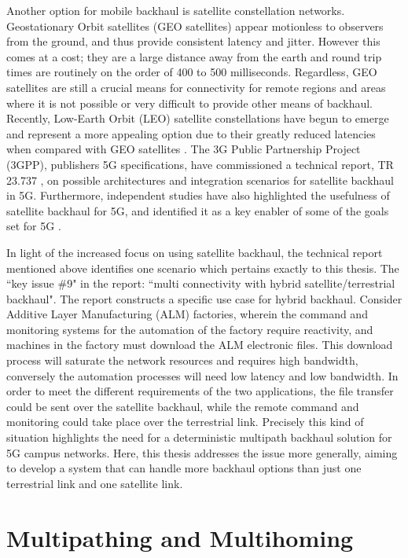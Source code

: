 Another option for mobile backhaul is satellite constellation networks. Geostationary Orbit satellites (GEO satellites) appear motionless to observers from the ground, and thus provide consistent latency and jitter. However this comes at a cost; they are a large distance away from the earth and round trip times are routinely on the order of 400 to 500 milliseconds. Regardless, GEO satellites are still a crucial means for connectivity for remote regions and areas where it is not possible or very difficult to provide other means of backhaul. Recently, Low-Earth Orbit (LEO) satellite constellations have begun to emerge and represent a more appealing option due to their greatly reduced latencies when compared with GEO satellites \cite{deutschmann2022broadband}. The 3G Public Partnership Project (3GPP), publishers 5G specifications, have commissioned a technical report, TR 23.737 \cite{3gpp.23.737}, on possible architectures and integration scenarios for satellite backhaul in 5G. Furthermore, independent studies have also highlighted the usefulness of satellite backhaul for 5G, and identified it as a key enabler of some of the goals set for 5G \cite{artiga2016terrestrial}.

In light of the increased focus on using satellite backhaul, the technical report mentioned above identifies one scenario which pertains exactly to this thesis. The “key issue \#9" in the report: “multi connectivity with hybrid satellite/terrestrial backhaul". The report constructs a specific use case for hybrid backhaul. Consider Additive Layer Manufacturing (ALM) factories, wherein the command and monitoring systems for the automation of the factory require reactivity, and machines in the factory must download the ALM electronic files. This download process will saturate the network resources and requires high bandwidth, conversely the automation processes will need low latency and low bandwidth. In order to meet the different requirements of the two applications, the file transfer could be sent over the satellite backhaul, while the remote command and monitoring could take place over the terrestrial link. Precisely this kind of situation highlights the need for a deterministic multipath backhaul solution for 5G campus networks. Here, this thesis addresses the issue more generally, aiming to develop a system that can handle more backhaul options than just one terrestrial link and one satellite link.


\section{Multipathing and Multihoming}

